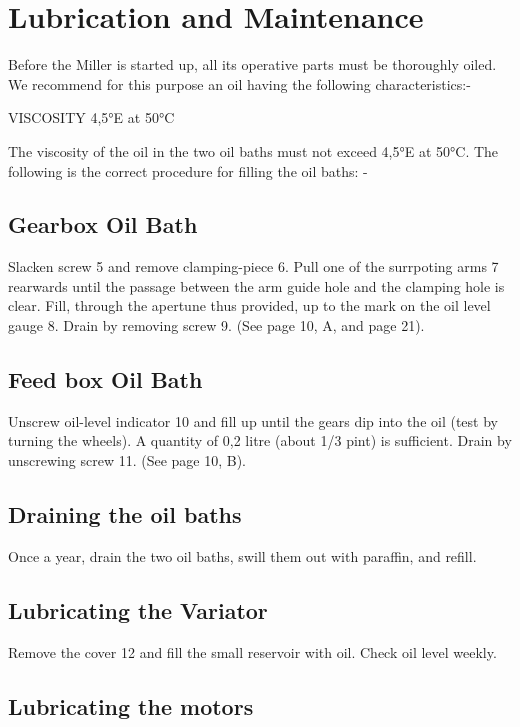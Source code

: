 \chapter{Lubrication and Maintenance}

Before the Miller is started up, all its operative parts must be
thoroughly oiled. We recommend for this purpose an oil having the
following characteristics:-

\begin{center}
    VISCOSITY 4,5°E at 50°C
\end{center}

The viscosity of the oil in the two oil baths must not exceed
4,5°E at 50°C. The following is the correct procedure for filling
the oil baths: -

\section*{Gearbox Oil Bath}

Slacken screw 5 and remove clamping-piece 6. Pull one of the
surrpoting arms 7 rearwards until the passage between the arm
guide hole and the clamping hole is clear. Fill, through the
apertune thus provided, up to the mark on the oil level gauge 8.
Drain by removing screw 9. (See page 10, A, and page 21).

\section*{Feed box Oil Bath}

Unscrew oil-level indicator 10 and fill up until the gears dip
into the oil (test by turning the wheels). A quantity of 0,2
litre (about 1/3 pint) is sufficient. Drain by unscrewing screw
11. (See page 10, B).

\section*{Draining the oil baths}

Once a year, drain the two oil baths, swill them out with
paraffin, and refill.

\section*{Lubricating the Variator}

Remove the cover 12 and fill the small reservoir with oil.
Check oil level weekly.

\section*{Lubricating the motors}

